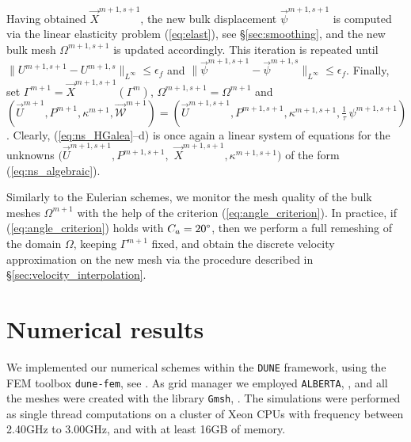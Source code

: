 \documentclass[a4paper,12pt,onecolumn]{article}
\newcommand{\W}{\vec{\mathcal W}}
\begin{document}
Having obtained $\vec X^{m+1,s+1}$, the new bulk displacement
$\vec \psi^{m+1,s+1}$ is computed via the linear elasticity problem
(\ref{eq:elast}), see \S\ref{sec:smoothing},
and the new bulk mesh $\Omega^{m+1,s+1}$ is updated accordingly.
This iteration is repeated until $\|U^{m+1,s+1}-U^{m+1,s}\|_{L^\infty}
\leq\epsilon_f$ and $\|\vec \psi^{m+1,s+1}-\vec \psi^{m+1,s}\|_{L^\infty}
\leq\epsilon_f$.
Finally, set
$\Gamma^{m+1} = \vec X^{m+1,s+1}(\Gamma^m)$, $\Omega^{m+1,s+1}=\Omega^{m+1}$
and \linebreak $(\vec U^{m+1}, P^{m+1}, \kappa^{m+1},\W^{m+1}) =
(\vec U^{m+1,s+1}, P^{m+1,s+1},\kappa^{m+1,s+1},\tfrac1\tau\,\psi^{m+1,s+1})$.
Clearly, \linebreak
\mbox{(\ref{eq:ns_HGalea}--d)} is once again
a linear system of equations for the unknowns
$(\vec U^{m+1,s+1}, P^{m+1,s+1},$ $ \vec X^{m+1,s+1},
\kappa^{m+1,s+1})$ of the form (\ref{eq:ns_algebraic}).

Similarly to the Eulerian schemes, we monitor the mesh quality of
the bulk meshes $\Omega^{m+1}$ with the help of the criterion
(\ref{eq:angle_criterion}). In practice, if (\ref{eq:angle_criterion})
holds with $C_a=20\degree$, then we perform a full remeshing of the domain
$\Omega$, keeping $\Gamma^{m+1}$ fixed, and obtain the discrete velocity
approximation on the new mesh via the procedure described in
\S\ref{sec:velocity_interpolation}.

\setcounter{equation}{0}
\section{Numerical results} \label{sec:nr}

We implemented our numerical schemes within the \verb|DUNE| framework,
using the FEM toolbox \verb|dune-fem|, see
\cite{dunegridpaperI08,dunegridpaperII08,dunefempaper10}.
As grid manager we employed \verb|ALBERTA|, \cite{Alberta},
and all the meshes were created with the library \verb|Gmsh|,
\cite{GeuzaineR09}.
The simulations were performed as single thread computations on a cluster of
Xeon CPUs with frequency between 2.40GHz to 3.00GHz, and with at
least 16GB of memory.
\end{document}

